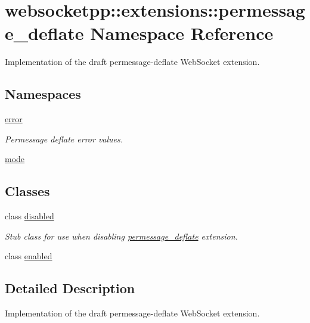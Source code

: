 \hypertarget{namespacewebsocketpp_1_1extensions_1_1permessage__deflate}{}\section{websocketpp\+:\+:extensions\+:\+:permessage\+\_\+deflate Namespace Reference}
\label{namespacewebsocketpp_1_1extensions_1_1permessage__deflate}


Implementation of the draft permessage-\/deflate Web\+Socket extension.  


\subsection*{Namespaces}
\begin{DoxyCompactItemize}
\item 
 \hyperlink{namespacewebsocketpp_1_1extensions_1_1permessage__deflate_1_1error}{error}
\begin{DoxyCompactList}\small\item\em Permessage deflate error values. \end{DoxyCompactList}\item 
 \hyperlink{namespacewebsocketpp_1_1extensions_1_1permessage__deflate_1_1mode}{mode}
\end{DoxyCompactItemize}
\subsection*{Classes}
\begin{DoxyCompactItemize}
\item 
class \hyperlink{classwebsocketpp_1_1extensions_1_1permessage__deflate_1_1disabled}{disabled}
\begin{DoxyCompactList}\small\item\em Stub class for use when disabling \hyperlink{namespacewebsocketpp_1_1extensions_1_1permessage__deflate}{permessage\+\_\+deflate} extension. \end{DoxyCompactList}\item 
class \hyperlink{classwebsocketpp_1_1extensions_1_1permessage__deflate_1_1enabled}{enabled}
\end{DoxyCompactItemize}


\subsection{Detailed Description}
Implementation of the draft permessage-\/deflate Web\+Socket extension. 

